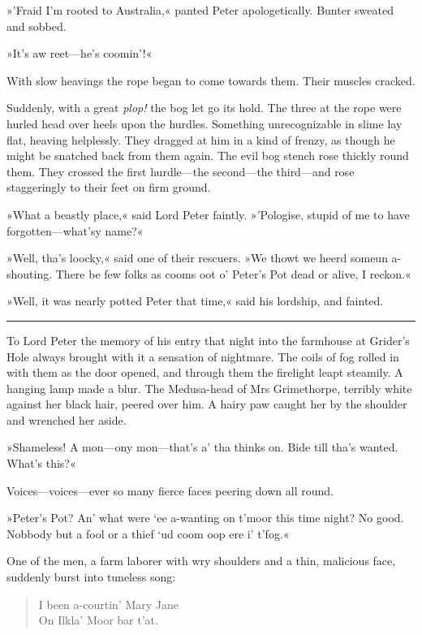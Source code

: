 »'Fraid I'm rooted to Australia,« panted Peter apologetically. Bunter sweated and sobbed.

»It's aw reet—he's coomin'!«

With slow heavings the rope began to come towards them. Their muscles cracked.

Suddenly, with a great \textit{plop!} the bog let go its hold. The three at the rope were hurled head over heels upon the hurdles. Something unrecognizable in slime lay flat, heaving helplessly. They dragged at him in a kind of frenzy, as though he might be snatched back from them again. The evil bog stench rose thickly round them. They crossed the first hurdle—the second—the third—and rose staggeringly to their feet on firm ground.

»What a beastly place,« said Lord Peter faintly. »'Pologise, stupid of me to have forgotten—what'sy name?«

»Well, tha's loocky,« said one of their rescuers. »We thowt we heerd someun a-shouting. There be few folks as cooms oot o' Peter's Pot dead or alive, I reckon.«

»Well, it was nearly potted Peter that time,« said his lordship, and fainted. 

\noindent\hfil\rule{0.5\textwidth}{.4pt}\hfil 

To Lord Peter the memory of his entry that night into the farmhouse at Grider's Hole always brought with it a sensation of nightmare.  The coils of fog rolled in with them as the door opened, and through them the firelight leapt steamily. A hanging lamp made a blur. The Medusa-head of Mrs Grimethorpe, terribly white against her black hair, peered over him. A hairy paw caught her by the shoulder and wrenched her aside.

»Shameless! A mon—ony mon—that's a' tha thinks on. Bide till tha's wanted. What's this?«

Voices—voices—ever so many fierce faces peering down all round.

»Peter's Pot? An' what were `ee a-wanting on t'moor this time night? No good. Nobbody but a fool or a thief `ud coom oop ere i' t'fog.«

One of the men, a farm laborer with wry shoulders and a thin, malicious face, suddenly burst into tuneless song: 

\begin{verse}
\begin{altverse}
I been a-courtin' Mary Jane\\
On Ilkla' Moor bar t'at.\\
\end{altverse}
\end{verse}

